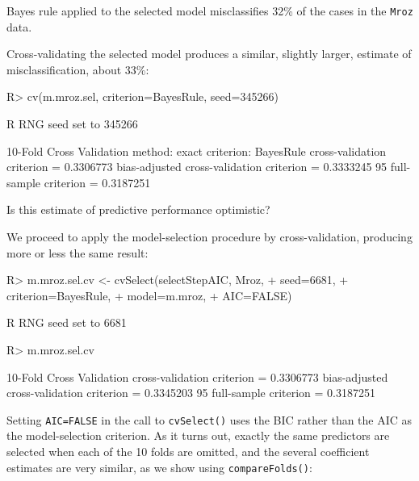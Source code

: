 \documentclass[
]{jss}
\begin{document}
Bayes rule applied to the selected model misclassifies 32\% of the cases
in the \texttt{Mroz} data.

Cross-validating the selected model produces a similar, slightly larger,
estimate of misclassification, about 33\%:

\begin{CodeChunk}
\begin{CodeInput}
R> cv(m.mroz.sel, criterion=BayesRule, seed=345266)
\end{CodeInput}
\begin{CodeOutput}
R RNG seed set to 345266
\end{CodeOutput}
\begin{CodeOutput}
10-Fold Cross Validation
method: exact
criterion: BayesRule
cross-validation criterion = 0.3306773
bias-adjusted cross-validation criterion = 0.3333245
95%
full-sample criterion = 0.3187251 
\end{CodeOutput}
\end{CodeChunk}

Is this estimate of predictive performance optimistic?

We proceed to apply the model-selection procedure by cross-validation,
producing more or less the same result:

\begin{CodeChunk}
\begin{CodeInput}
R> m.mroz.sel.cv <- cvSelect(selectStepAIC, Mroz, 
+                           seed=6681,
+                           criterion=BayesRule,
+                           model=m.mroz,
+                           AIC=FALSE)
\end{CodeInput}
\begin{CodeOutput}
R RNG seed set to 6681
\end{CodeOutput}
\begin{CodeInput}
R> m.mroz.sel.cv
\end{CodeInput}
\begin{CodeOutput}
10-Fold Cross Validation
cross-validation criterion = 0.3306773
bias-adjusted cross-validation criterion = 0.3345203
95%
full-sample criterion = 0.3187251 
\end{CodeOutput}
\end{CodeChunk}

Setting \texttt{AIC=FALSE} in the call to \texttt{cvSelect()} uses the
BIC rather than the AIC as the model-selection criterion. As it turns
out, exactly the same predictors are selected when each of the 10 folds
are omitted, and the several coefficient estimates are very similar, as
we show using \texttt{compareFolds()}:
\end{document}
